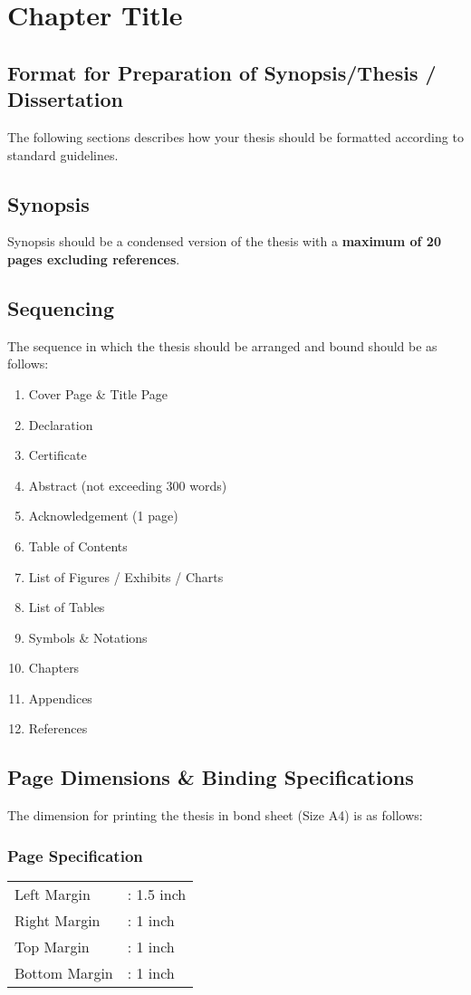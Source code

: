 \chapter{Chapter Title} \label{c4}
\section{Format for Preparation of Synopsis/Thesis / Dissertation}
The following sections describes how your thesis should be formatted according to standard guidelines.
\section{Synopsis}
Synopsis should be a condensed version of the thesis with a \textbf{maximum of 20 pages excluding references}.

\section{Sequencing}
The sequence in which the thesis should be arranged and bound should be as follows:
\begin{enumerate}\itemsep 0em
	\item Cover Page \& Title Page
	\item Declaration 
	\item Certificate
	\item Abstract (not exceeding 300 words)
	\item Acknowledgement (1 page)
	\item Table of Contents
	\item List of Figures / Exhibits / Charts 
	\item List of Tables 
	\item Symbols \& Notations
	\item Chapters
	\item Appendices
	\item References	
\end{enumerate}

\section{Page Dimensions \& Binding Specifications}
The dimension for printing the thesis in bond sheet (Size A4) is as follows:

\subsection{Page Specification}
\begin{table}[htb]
	\begin{tabular}{ll}
	Left Margin 		&: 1.5 inch \\
	Right Margin		&: 1 inch \\
	Top Margin		&: 1 inch \\
	Bottom Margin	&: 1 inch 
	
	\end{tabular}	
\end{table}

